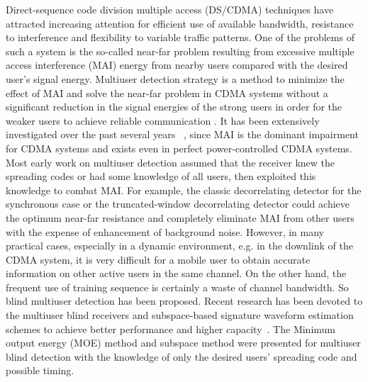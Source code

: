 \documentclass[a4paper,11pt,fleqn]{article}
\begin{document}
Direct-sequence code division multiple access (DS/CDMA) techniques
have attracted increasing attention for efficient use of available
bandwidth, resistance to interference and flexibility to variable
traffic patterns. One of the problems of such a system is the
so-called near-far problem resulting from excessive multiple
access interference (MAI) energy from nearby users compared with
the desired user's signal energy. Multiuser detection strategy is
a method to minimize the effect of MAI and solve the near-far
problem in CDMA systems without a significant reduction in the
signal energies of the strong users in order for the weaker users
to achieve reliable communication . It has been extensively
investigated over the past several years ~\cite{Verd98}, since MAI
is the dominant impairment for CDMA systems and exists even in
perfect power-controlled CDMA systems. Most early work on
multiuser detection assumed that the receiver knew the spreading
codes or had some knowledge of all users, then exploited this
knowledge to combat MAI. For example, the classic decorrelating
detector for the synchronous case or the truncated-window
decorrelating detector could achieve the optimum near-far
resistance and completely eliminate MAI from other users with the
expense of enhancement of background noise. However, in many
practical cases, especially in a dynamic environment, e.g. in the
downlink of the CDMA system, it is very difficult for a mobile
user to obtain accurate information on other active users in the
same channel. On the other hand, the frequent use of training
sequence is certainly a waste of channel bandwidth. So blind
multiuser detection has been proposed. Recent research has been
devoted to the multiuser blind receivers and subspace-based
signature waveform estimation schemes to achieve better
performance and higher capacity~\cite{Honi95, Poor97, Wang98,
Torl97, Liu96}. The Minimum output energy (MOE) method and
subspace method were presented for multiuser blind detection with
the knowledge of only the desired users' spreading code and
possible timing.
\end{document}
